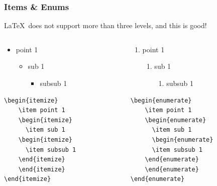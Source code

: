 \documentclass[aspectratio=169]{beamer}
\begin{document}
\begin{frame}[containsverbatim]
\frametitle{Items \& Enums}

\LaTeX\ does not support more than three levels, and this is good!

\begin{columns}
\begin{column}{.45\textwidth}
\begin{itemize}
	\item point 1
	\begin{itemize}
	  \item sub 1
	\begin{itemize}
	  \item subsub 1
	\end{itemize}
	\end{itemize}
\end{itemize} 
\begin{verbatim}
\begin{itemize}
	\item point 1
	\begin{itemize}
	  \item sub 1
	\begin{itemize}
	  \item subsub 1
	\end{itemize}
	\end{itemize}
\end{itemize} 
\end{verbatim}
\end{column}

\begin{column}{.45\textwidth}
\begin{enumerate}
	\item point 1
	\begin{enumerate}
	  \item sub 1
	  \begin{enumerate}
	  \item subsub 1
	\end{enumerate}
	\end{enumerate}
\end{enumerate} 
\begin{verbatim}
\begin{enumerate}
	\item point 1
	\begin{enumerate}
	  \item sub 1
	  \begin{enumerate}
	  \item subsub 1
	\end{enumerate}
	\end{enumerate}
\end{enumerate}  
\end{verbatim}
\end{column}
\end{columns}

\end{frame}
\end{document}
